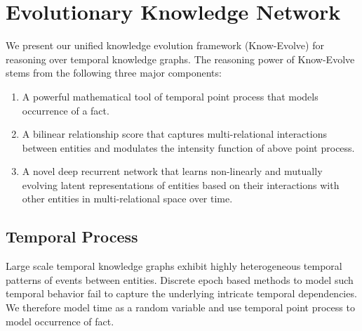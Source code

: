 \documentclass{article}
\begin{document}
\vspace{-0.3cm}
\section{Evolutionary Knowledge Network} 
\vspace{-0.1cm}

We present our unified knowledge evolution framework (Know-Evolve) for reasoning over temporal knowledge graphs. 
The reasoning power of Know-Evolve stems from the following three major components:
\vspace{-0.1cm}
\begin{enumerate}
\item A powerful mathematical tool of temporal point process that models occurrence of a fact.
\vspace{-0.1cm}
\item A bilinear relationship score that captures multi-relational interactions between entities and modulates the intensity function of above point process.
\vspace{-0.1cm}
\item  A novel deep recurrent network that learns non-linearly and mutually evolving latent representations of entities based on their interactions with other entities in multi-relational space over time. 
\end{enumerate}
\vspace{-0.4cm}
\subsection{Temporal Process}

Large scale temporal knowledge graphs exhibit highly heterogeneous temporal patterns of events between entities. Discrete epoch based methods to model such temporal behavior fail to capture the underlying intricate temporal dependencies. We therefore model time as a random variable and use temporal point process to model occurrence of fact. 
\end{document}
